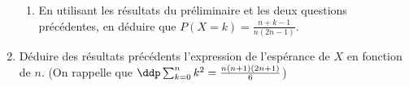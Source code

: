 \documentclass[a4paper, 11pt,reqno]{article}
\begin{document}
\begin{exercice}
\begin{enumerate}
\begin{enumerate}
\item En utilisant les résultats du préliminaire et les deux questions précédentes, en déduire que $P(X=k)=\frac{n+k-1}{n(2 n-1)}$.
\end{enumerate}

\item  Déduire des résultats précédents l'expression de l'espérance de $X$ en fonction de $n$. (On rappelle que 
$\ddp \sum_{k=0}^n k^2 =\frac{n(n+1)(2n+1)}{6}$)
\end{enumerate}


\end{exercice}
\end{document}
